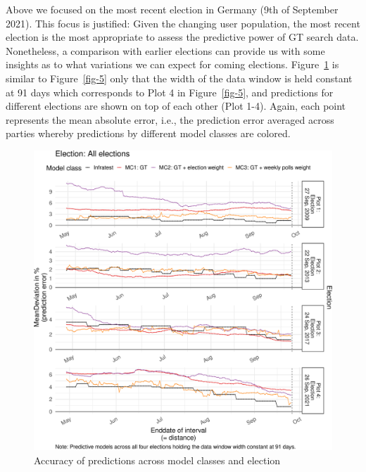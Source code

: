 \documentclass[
  letterpaper,
  DIV=11,
  numbers=noendperiod]{scrartcl}
\begin{document}
Above we focused on the most recent election in Germany (9th of
September 2021). This focus is justified: Given the changing user
population, the most recent election is the most appropriate to assess
the predictive power of GT search data. Nonetheless, a comparison with
earlier elections can provide us with some insights as to what
variations we can expect for coming elections. Figure~\ref{fig-6} is
similar to Figure~\ref{fig-5} only that the width of the data window is
held constant at 91 days which corresponds to Plot 4 in
Figure~\ref{fig-5}, and predictions for different elections are shown on
top of each other (Plot 1-4). Again, each point represents the mean
absolute error, i.e., the prediction error averaged across parties
whereby predictions by different model classes are colored.

\begin{figure}[H]

\caption{\label{fig-6}Accuracy of predictions across model classes and
election}

{\centering \includegraphics{figures/fig-6-1.pdf}

}

\end{figure}
\end{document}
